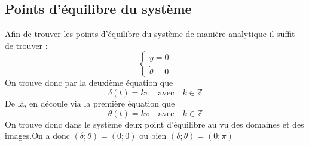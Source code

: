 \documentclass[11pt,a4paper]{article}
\begin{document}
\subsection{Points d'équilibre du système}
Afin de trouver les points d'équilibre du système de manière analytique il suffit de trouver :
\begin{equation}
	\begin{cases}
		\dot y=0 \\
		\dot \theta=0%
	\end{cases}
\end{equation}
On trouve donc par la deuxième équation que
$$\delta(t) = k\pi \quad \text{avec} \quad k \in \mathbb{Z}$$
De là, en découle via la première équation que
$$\theta(t)=k\pi \quad \text{avec} \quad k \in \mathbb{Z}$$
On trouve donc dans le système deux point d'équilibre au vu des domaines et des images.On a donc $(\delta;\theta)=(0;0)$ ou bien $(\delta;\theta)=(0;\pi)$
\end{document}
